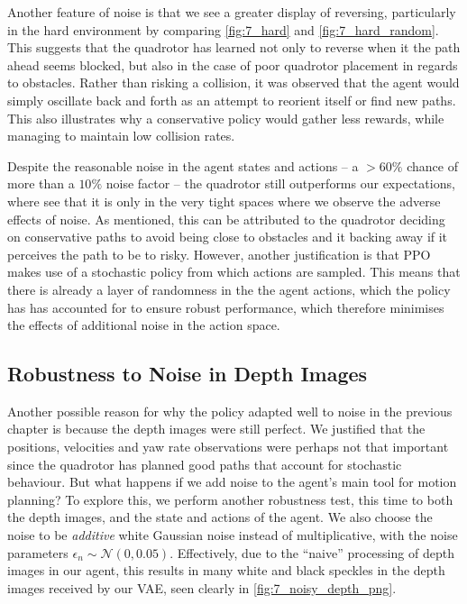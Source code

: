 Another feature of noise is that we see a greater display of reversing, particularly in the hard environment by comparing \cref{fig:7_hard} and \cref{fig:7_hard_random}. This suggests that the quadrotor has learned not only to reverse when it the path ahead seems blocked, but also in the case of poor quadrotor placement in regards to obstacles. Rather than risking a collision, it was observed that the agent would simply oscillate back and forth as an attempt to reorient itself or find new paths. This also illustrates why a conservative policy would gather less rewards, while managing to maintain low collision rates.

Despite the reasonable noise in the agent states and actions -- a $>60\%$ chance of more than a $10\%$ noise factor -- the quadrotor still outperforms our expectations, where see that it is only in the very tight spaces where we observe the adverse effects of noise. As mentioned, this can be attributed to the quadrotor deciding on conservative paths to avoid being close to obstacles and it backing away if it perceives the path to be to risky. However, another justification is that PPO makes use of a stochastic policy from which actions are sampled. This means that there is already a layer of randomness in the the agent actions, which the policy has has accounted for to ensure robust performance, which therefore minimises the effects of additional noise in the action space.


\subsection{Robustness to Noise in Depth Images}
Another possible reason for why the policy adapted well to noise in the previous chapter is because the depth images were still perfect. We justified that the positions, velocities and yaw rate observations were perhaps not that important since the quadrotor has planned good paths that account for stochastic behaviour. But what happens if we add noise to the agent's main tool for motion planning? To explore this, we perform another robustness test, this time to both the depth images, and the state and actions of the agent. We also choose the noise to be \textit{additive} white Gaussian noise instead of multiplicative, with the noise parameters $\epsilon_n \sim \mathcal{N}(0, 0.05)$. Effectively, due to the ``naive'' processing of depth images in our agent, this results in many white and black speckles in the depth images received by our VAE, seen clearly in \cref{fig:7_noisy_depth_png}.

